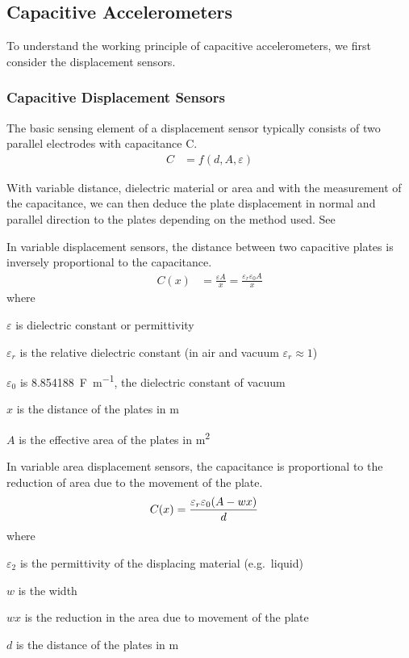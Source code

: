 \subsection{Capacitive Accelerometers}

To understand the working principle of capacitive accelerometers, we first consider the displacement sensors.

\subsubsection{Capacitive Displacement Sensors}
The basic sensing element of a displacement sensor typically consists of two parallel electrodes with capacitance C.
\begin{align}
  C &= f(d,A,\varepsilon)
\end{align}

With variable distance, dielectric material or area and with the measurement of the capacitance, we can then deduce the plate displacement in normal and parallel direction to the plates depending on the method used. See 

In variable displacement sensors, the distance between two capacitive plates is inversely proportional to the capacitance.
\begin{align}
  C(x) &= \frac{\varepsilon A}{x} = \frac{\varepsilon_r\varepsilon_0 A}{x}
\end{align}
where
\begin{description}[topsep=0ex, noitemsep]
  \item $\varepsilon$ is dielectric constant or permittivity
  \item $\varepsilon_r$ is the relative dielectric constant (in air and vacuum $\varepsilon_r\approx 1$)
  \item $\varepsilon_0$ is \SI{8.854188}{\farad\per\meter}, the dielectric constant of vacuum
  \item $x$ is the distance of the plates in \si{\meter}
  \item $A$ is the effective area of the plates in \si{\meter\squared}
\end{description}

In variable area displacement sensors, the capacitance is proportional to the reduction of area due to the movement of the plate.
\begin{align}
  C(x) &= \frac{\varepsilon_r\varepsilon_0\pqty{A-wx}}{d}\label{eqn:var_ar_displace}
\end{align}
where
\begin{description}[topsep=0ex, noitemsep]
  \item $\varepsilon_2$ is the permittivity of the displacing material (e.g.\ liquid)
  \item $w$ is the width
  \item $wx$ is the reduction in the area due to movement of the plate
  \item $d$ is the distance of the plates in \si{\meter}
\end{description}


